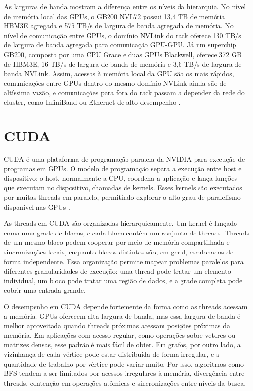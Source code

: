As larguras de banda mostram a diferença entre os níveis da hierarquia. No nível
de memória local das GPUs, o GB200 NVL72 possui 13,4 TB de memória HBM3E agregada
e 576 TB/s de largura de banda agregada de memória. No nível de comunicação entre
GPUs, o domínio NVLink do rack oferece 130 TB/s de largura de banda agregada para
comunicação GPU-GPU. Já um superchip GB200, composto por uma CPU Grace e duas
GPUs Blackwell, oferece 372 GB de HBM3E, 16 TB/s de largura de banda de memória e
3,6 TB/s de largura de banda NVLink. Assim, acessos à memória local da GPU são os
mais rápidos, comunicações entre GPUs dentro do mesmo domínio NVLink ainda são de
altíssima vazão, e comunicações para fora do rack passam a depender da rede do
cluster, como InfiniBand ou Ethernet de alto desempenho \cite{nvidiagb200nvl72}.

\section{CUDA}
\label{sec:cuda}

CUDA é uma plataforma de programação paralela da NVIDIA para execução de
programas em GPUs. O modelo de programação separa a execução entre host e
dispositivo: o host, normalmente a CPU, coordena a aplicação e lança funções que
executam no dispositivo, chamadas de kernels. Esses kernels são executados por
muitas threads em paralelo, permitindo explorar o alto grau de paralelismo
disponível nas GPUs \cite{cudaguide}.

As threads em CUDA são organizadas hierarquicamente. Um kernel é lançado como uma
grade de blocos, e cada bloco contém um conjunto de threads. Threads de um mesmo
bloco podem cooperar por meio de memória compartilhada e sincronizações locais,
enquanto blocos distintos são, em geral, escalonados de forma independente. Essa
organização permite mapear problemas paralelos para diferentes granularidades de
execução: uma thread pode tratar um elemento individual, um bloco pode tratar uma
região de dados, e a grade completa pode cobrir uma entrada grande.

O desempenho em CUDA depende fortemente da forma como as threads acessam a
memória. GPUs oferecem alta largura de banda, mas essa largura de banda é melhor
aproveitada quando threads próximas acessam posições próximas da memória. Em
aplicações com acesso regular, como operações sobre vetores ou matrizes densas,
esse padrão é mais fácil de obter. Em grafos, por outro lado, a vizinhança de
cada vértice pode estar distribuída de forma irregular, e a quantidade de
trabalho por vértice pode variar muito. Por isso, algoritmos como BFS tendem a
ser limitados por acessos irregulares à memória, divergência entre threads,
contenção em operações atômicas e sincronizações entre níveis da busca.

